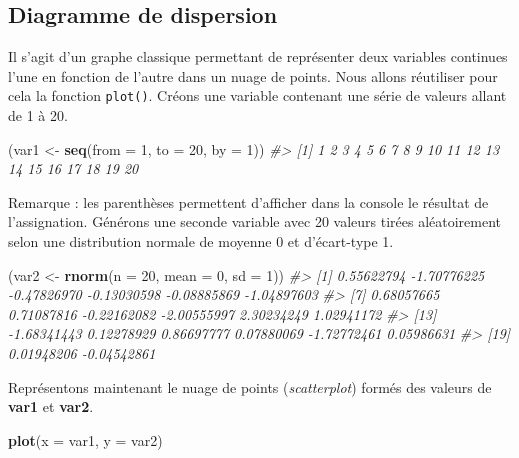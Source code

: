 \documentclass[]{article}
\newenvironment{Shaded}{\begin{snugshade}}{\end{snugshade}}
\newcommand{\CommentTok}[1]{\textcolor[rgb]{0.56,0.35,0.01}{\textit{#1}}}
\newcommand{\DataTypeTok}[1]{\textcolor[rgb]{0.13,0.29,0.53}{#1}}
\newcommand{\DecValTok}[1]{\textcolor[rgb]{0.00,0.00,0.81}{#1}}
\newcommand{\KeywordTok}[1]{\textcolor[rgb]{0.13,0.29,0.53}{\textbf{#1}}}
\newcommand{\NormalTok}[1]{#1}
\newcommand{\StringTok}[1]{\textcolor[rgb]{0.31,0.60,0.02}{#1}}
\begin{document}
\hypertarget{diagramme-de-dispersion}{%
\subsection{Diagramme de dispersion}\label{diagramme-de-dispersion}}

Il s'agit d'un graphe classique permettant de représenter deux variables continues l'une en fonction de l'autre dans un nuage de points. Nous allons réutiliser pour cela la fonction \texttt{plot()}.
Créons une variable contenant une série de valeurs allant de 1 à 20.

\begin{Shaded}
\begin{Highlighting}[]
\NormalTok{(var1 <-}\StringTok{ }\KeywordTok{seq}\NormalTok{(}\DataTypeTok{from =} \DecValTok{1}\NormalTok{, }\DataTypeTok{to =} \DecValTok{20}\NormalTok{, }\DataTypeTok{by =} \DecValTok{1}\NormalTok{))}
\CommentTok{#>  [1]  1  2  3  4  5  6  7  8  9 10 11 12 13 14 15 16 17 18 19 20}
\end{Highlighting}
\end{Shaded}

Remarque : les parenthèses permettent d'afficher dans la console le résultat de l'assignation. Générons une seconde variable avec 20 valeurs tirées aléatoirement selon une distribution normale de moyenne 0 et d'écart-type 1.

\begin{Shaded}
\begin{Highlighting}[]
\NormalTok{(var2 <-}\StringTok{ }\KeywordTok{rnorm}\NormalTok{(}\DataTypeTok{n =} \DecValTok{20}\NormalTok{, }\DataTypeTok{mean =} \DecValTok{0}\NormalTok{, }\DataTypeTok{sd =} \DecValTok{1}\NormalTok{))}
\CommentTok{#>  [1]  0.55622794 -1.70776225 -0.47826970 -0.13030598 -0.08885869 -1.04897603}
\CommentTok{#>  [7]  0.68057665  0.71087816 -0.22162082 -2.00555997  2.30234249  1.02941172}
\CommentTok{#> [13] -1.68341443  0.12278929  0.86697777  0.07880069 -1.72772461  0.05986631}
\CommentTok{#> [19]  0.01948206 -0.04542861}
\end{Highlighting}
\end{Shaded}

Représentons maintenant le nuage de points (\emph{scatterplot}) formés des valeurs de \textbf{var1} et \textbf{var2}.

\begin{Shaded}
\begin{Highlighting}[]
\KeywordTok{plot}\NormalTok{(}\DataTypeTok{x =}\NormalTok{ var1, }\DataTypeTok{y =}\NormalTok{ var2)}
\end{Highlighting}
\end{Shaded}
\end{document}
